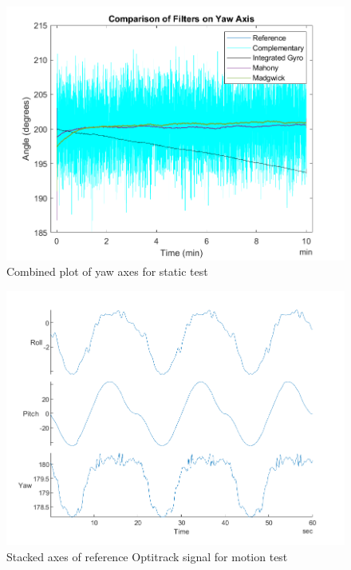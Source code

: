 \begin{figure}[H]
    \centering
    \includegraphics[scale=1]{graphics/Navigation/CombinedStaticYaw.png}
    \caption{Combined plot of yaw axes for static test}
     \label{fig:Combined plot of yaw axes for static test}
\end{figure}


\begin{figure}[H]
    \centering
    \includegraphics[scale=1]{graphics/Navigation/StackedMotionOpti.png}
    \caption{Stacked axes of reference Optitrack signal for motion test}
     \label{fig:Stacked axes of reference Optitrack signal for motion test}
\end{figure} 


